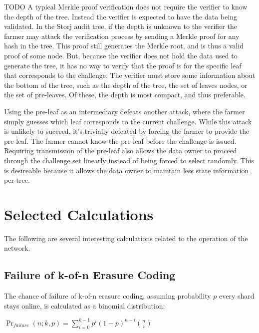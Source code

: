 \documentclass[a4paper,10pt]{article}
\newcommand{\todo}[1]{{\color{red} TODO #1}}
\begin{document}
\todo{
A typical Merkle proof verification does not require the verifier to know the
depth of the tree. Instead the verifier is expected to have the data being
validated. In the Storj audit tree, if the depth is unknown to the verifier the
farmer may attack the verification process by sending a Merkle proof for any
hash in the tree. This proof still generates the Merkle root, and is thus a
valid proof of some node. But, because the verifier does not hold the data used
to generate the tree, it has no way to verify that the proof is for the specific
leaf that corresponds to the challenge. The verifier must store some information
about the bottom of the tree, such as the depth of the tree, the set of leaves
nodes, or the set of pre-leaves. Of these, the depth is most compact, and thus
preferable.

Using the pre-leaf as an intermediary defeats another attack, where the farmer
simply guesses which leaf corresponds to the current challenge. While this
attack is unlikely to succeed, it’s trivially defeated by forcing the farmer to
provide the pre-leaf. The farmer cannot know the pre-leaf before the challenge
is issued. Requiring transmission of the pre-leaf also allows the data owner to
proceed through the challenge set linearly instead of being forced to select
randomly. This is desireable because it allows the data owner to maintain less
state information per tree.
}

\section{Selected Calculations}

The following are several interesting calculations related to the operation of
the network.

\subsection{Failure of k-of-n Erasure Coding}

The chance of failure of k-of-n erasure coding, assuming probability $ p $ every
shard stays online, is calculated as a binomial distribution:

{\centering
$\Pr_{failure}(n; k,p) = \displaystyle \sum_{i=0}^{k-1} p^{i}(1-p)^{n-i}{n
\choose i}$
\\}
\end{document}
